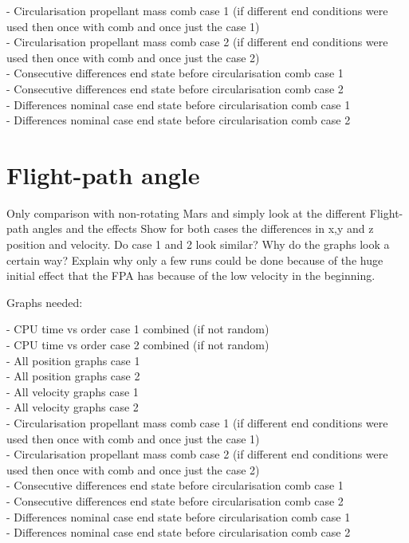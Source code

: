 - Circularisation propellant mass comb case 1 (if different end conditions were used then once with comb and once just the case 1) \\
- Circularisation propellant mass comb case 2 (if different end conditions were used then once with comb and once just the case 2) \\
- Consecutive differences end state before circularisation comb case 1 \\
- Consecutive differences end state before circularisation comb case 2 \\
- Differences nominal case end state before circularisation comb case 1 \\
- Differences nominal case end state before circularisation comb case 2 \\



\section{Flight-path angle}
\label{sec:flightPathAngle}

Only comparison with non-rotating Mars and simply look at the different Flight-path angles and the effects
Show for both cases the differences in x,y and z position and velocity. Do case 1 and 2 look similar? Why do the graphs look a certain way?
Explain why only a few runs could be done because of the huge initial effect that the FPA has because of the low velocity in the beginning.

Graphs needed:

- CPU time vs order case 1 combined (if not random) \\
- CPU time vs order case 2 combined (if not random) \\
- All position graphs case 1 \\
- All position graphs case 2 \\
- All velocity graphs case 1 \\
- All velocity graphs case 2 \\

- Circularisation propellant mass comb case 1 (if different end conditions were used then once with comb and once just the case 1) \\
- Circularisation propellant mass comb case 2 (if different end conditions were used then once with comb and once just the case 2) \\
- Consecutive differences end state before circularisation comb case 1 \\
- Consecutive differences end state before circularisation comb case 2 \\
- Differences nominal case end state before circularisation comb case 1 \\
- Differences nominal case end state before circularisation comb case 2 \\


